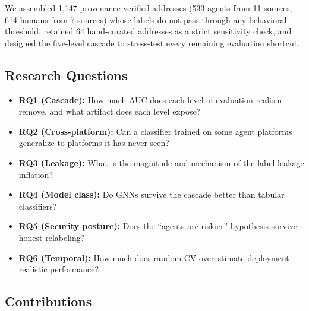 \documentclass[sigconf,nonacm=false]{acmart}
\begin{document}
We assembled 1{,}147 provenance-verified addresses (533 agents from 11 sources, 614 humans from 7 sources) whose labels do not pass through any behavioral threshold, retained 64 hand-curated addresses as a strict sensitivity check, and designed the five-level cascade to stress-test every remaining evaluation shortcut.

\subsection{Research Questions}

\begin{itemize}
    \item \textbf{RQ1 (Cascade):} How much AUC does each level of evaluation realism remove, and what artifact does each level expose?
    \item \textbf{RQ2 (Cross-platform):} Can a classifier trained on some agent platforms generalize to platforms it has never seen?
    \item \textbf{RQ3 (Leakage):} What is the magnitude and mechanism of the label-leakage inflation?
    \item \textbf{RQ4 (Model class):} Do GNNs survive the cascade better than tabular classifiers?
    \item \textbf{RQ5 (Security posture):} Does the ``agents are riskier'' hypothesis survive honest relabeling?
    \item \textbf{RQ6 (Temporal):} How much does random CV overestimate deployment-realistic performance?
\end{itemize}

\subsection{Contributions}
\end{document}
